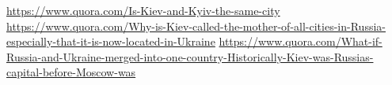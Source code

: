  
 
 
 
 

\url{https://www.quora.com/Is-Kiev-and-Kyiv-the-same-city}
\url{https://www.quora.com/Why-is-Kiev-called-the-mother-of-all-cities-in-Russia-especially-that-it-is-now-located-in-Ukraine}
\url{https://www.quora.com/What-if-Russia-and-Ukraine-merged-into-one-country-Historically-Kiev-was-Russias-capital-before-Moscow-was}

